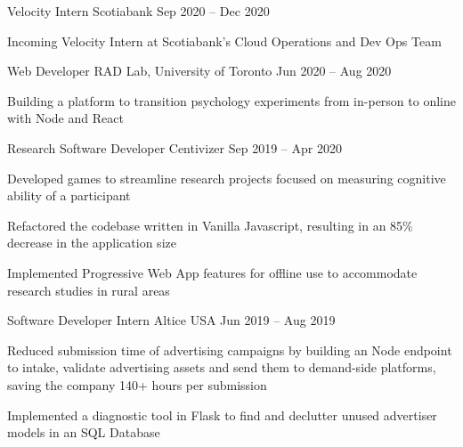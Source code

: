 \begin{cventries}
  \cventry
    {Velocity Intern}
    {Scotiabank}
    {}
    {Sep 2020 -- Dec 2020}
    {}
    {
      \begin{cvitems}
        \item {Incoming Velocity Intern at Scotiabank's Cloud Operations and Dev Ops Team}
      \end{cvitems}
    }

  \cventry
    {Web Developer}
    {RAD Lab, University of Toronto}
    {}
    {Jun 2020 -- Aug 2020}
    {}
    {
      \begin{cvitems}
        \item {Building a platform to transition psychology experiments from in-person to online with Node and React}
      \end{cvitems}
    }

  \cventry
    {Research Software Developer}
    {Centivizer}
    {}
    {Sep 2019 -- Apr 2020}
    {}
    {
      \begin{cvitems}
        \item {Developed games to streamline research projects focused on measuring cognitive ability of a participant}
        \item {Refactored the codebase written in Vanilla Javascript, resulting in an 85\% decrease in the application size}
        \item {Implemented Progressive Web App features for offline use to accommodate research studies in rural areas}
      \end{cvitems}
    }

  \cventry
    {Software Developer Intern}
    {Altice USA}
    {}
    {Jun 2019 -- Aug 2019}
    {}
    {
    \begin{cvitems}
      \item {Reduced submission time of advertising campaigns by building an Node endpoint to intake, validate advertising assets and send them to demand-side platforms, saving the company 140+ hours per submission}
      \item {Implemented a diagnostic tool in Flask to find and declutter unused advertiser models in an SQL Database}
    \end{cvitems}
    }


\end{cventries}
